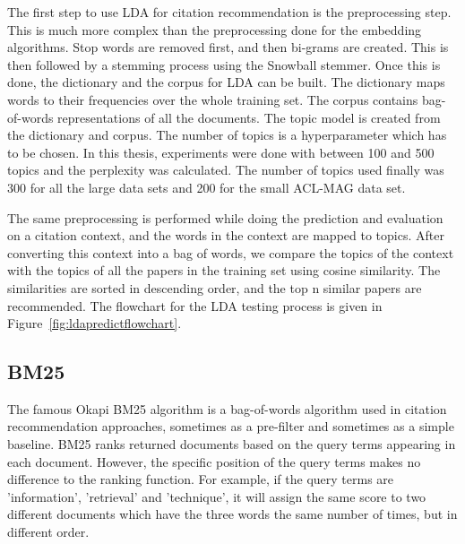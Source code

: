The first step to use LDA for citation recommendation is the preprocessing step. This is much more complex than the preprocessing done for the embedding algorithms. Stop words are removed first, and then bi-grams are created. This is then followed by a stemming process using the Snowball stemmer. 
Once this is done, the dictionary and the corpus for LDA can be built. The dictionary maps words to their frequencies over the whole training set. The corpus contains bag-of-words representations of all the documents. The topic model is created from the dictionary and corpus. The number of topics is a hyperparameter which has to be chosen. In this thesis, experiments were done with between 100 and 500 topics and the perplexity was calculated. The number of topics used finally was 300 for all the large data sets and 200 for the small ACL-MAG data set.

The same preprocessing is performed while doing the prediction and evaluation on a citation context, and the words in the context are mapped to topics. After converting this context into a bag of words, we compare the topics of the context with the topics of all the papers in the training set using cosine similarity. The similarities are sorted in descending order, and the top n similar papers are recommended.
The flowchart for the LDA testing process is given in Figure~\ref{fig:ldapredictflowchart}.
\subsection{BM25}
The famous Okapi BM25 algorithm is a bag-of-words algorithm used in citation recommendation approaches, sometimes as a pre-filter and sometimes as a simple baseline. BM25 ranks returned documents based on the query terms appearing in each document. However, the specific position of the query terms makes no difference to the ranking function. For example, if the query terms are 'information', 'retrieval' and 'technique', it will assign the same score to two different documents which have the three words the same number of times, but in different order. 


